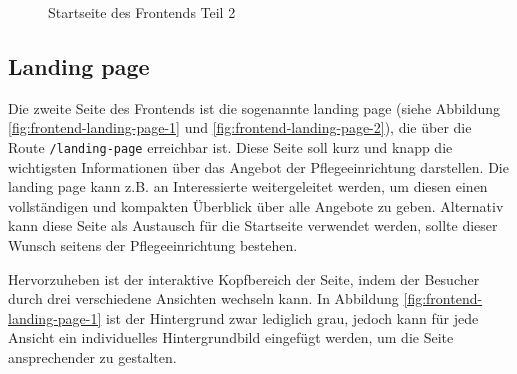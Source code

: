 \begin{figure}[H]
  \setlength{\fboxsep}{0pt}
  \setlength{\fboxrule}{0.5pt}
  \centering
  \caption[Startseite des Frontends Teil 2]{Startseite des Frontends Teil 2}
  \label{fig:frontend-homepage-2}
\end{figure}

%
%
\subsection{Landing page}

Die zweite Seite des Frontends ist die sogenannte landing page (siehe Abbildung \ref{fig:frontend-landing-page-1} und \ref{fig:frontend-landing-page-2}), die über die Route \lstinline{/landing-page} erreichbar ist. Diese Seite soll kurz und knapp die wichtigsten Informationen über das Angebot der Pflegeeinrichtung darstellen. Die landing page kann z.B. an Interessierte weitergeleitet werden, um diesen einen vollständigen und kompakten Überblick über alle Angebote zu geben. Alternativ kann diese Seite als Austausch für die Startseite verwendet werden, sollte dieser Wunsch seitens der Pflegeeinrichtung bestehen.

Hervorzuheben ist der interaktive Kopfbereich der Seite, indem der Besucher durch drei verschiedene Ansichten wechseln kann. In Abbildung \ref{fig:frontend-landing-page-1} ist der Hintergrund zwar lediglich grau, jedoch kann für jede Ansicht ein individuelles Hintergrundbild eingefügt werden, um die Seite ansprechender zu gestalten.

